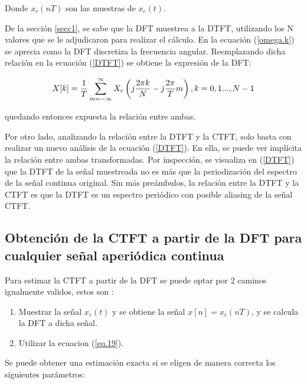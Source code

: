 \documentclass[11pt,a4paper]{article}
\begin{document}
Donde $x_{c}(nT)$ son las muestras de $x_{c}(t)$.
 
 De la sección \ref{secc1}, se sabe que la DFT muestrea a la DTFT, utilizando los N valores que se le adjudicaron para realizar el cálculo. En la ecuación (\ref{omega.k}) se aprecia como la DFT discretiza la frecuencia angular. Reemplazando dicha relación en la ecuación (\ref{DTFT}) se obtiene la expresión de la DFT:
 
 \begin{equation}
 X[k] = \frac{1}{T}\sum_{m=- \infty}^{\infty} X_{c} \left(j \frac{2 \pi k }{N} - j \frac{2 \pi}{T}	m \right)    , k =0,1..., N-1 \\
 \label{eq.19}
 \end{equation}
 
 quedando entonces expuesta la relación entre ambas.
 
 Por otro lado, analizando la relación entre la DTFT y la CTFT, solo basta con realizar un nuevo análisis de la ecuación (\ref{DTFT}). En ella, se puede ver implícita la relación entre ambas transformadas.
 Por inspección, se visualiza en (\ref{DTFT}) que la DTFT de la señal muestreada no es más que la periodización del espectro de la señal continua original.
 Sin más preámbulos, la relación entre la DTFT y la CTFT es que la DTFT es un espectro periódico con posible aliasing de la señal CTFT.

\subsection{Obtención de la CTFT a partir de la DFT para cualquier señal aperiódica continua}  
\label{secc4c}
Para estimar la CTFT a partir de la DFT se puede optar por 2 caminos igualmente validos, estos son :  

\begin{enumerate}  
\item Muestrar la señal $x_{c}(t)$ y se obtiene la señal $x[n]=x_{c}(nT)$, y se calcula la DFT a dicha señal.  
\item Utilizar la ecuacion (\ref{eq.19}).  
\end{enumerate} 

Se puede obtener una estimación exacta si se eligen de manera correcta los siguientes parámetros:  
\end{document}
